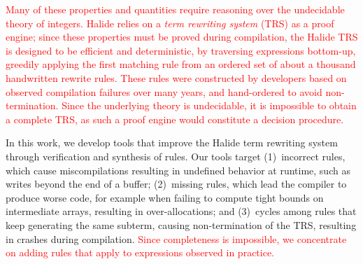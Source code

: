 \documentclass[acmsmall,review,anonymous]{acmart}\settopmatter{printfolios=true,printccs=false,printacmref=false}
\newcommand{\modified}[1]{\textcolor{red}{{#1}}}
\begin{document}
\modified{Many of these properties and quantities require reasoning over the
  undecidable theory of integers.  Halide relies on a \textit{term rewriting system}
  (TRS) as a proof engine; since these properties must be proved during compilation,
  the Halide TRS is designed to be efficient and deterministic, by traversing
  expressions bottom-up, greedily applying the first matching rule from an ordered
  set of about a thousand handwritten rewrite rules.  These rules were constructed
  by developers based on observed compilation failures over many years, and
  hand-ordered to avoid non-termination.  Since the underlying theory is undecidable,
  it is impossible to obtain a complete TRS, as such a proof engine would constitute
  a decision procedure. 
}

In this work, we develop tools that improve the Halide term rewriting
system through verification and synthesis of rules.  
%
Our tools target  (1)~incorrect rules, which cause miscompilations
resulting in undefined behavior at runtime, such as writes beyond the end of a
buffer;  (2)~missing rules, which lead  the compiler to produce worse code,
for example when failing to compute tight bounds on intermediate arrays, resulting
in over-allocations; and (3)~cycles among rules that keep generating the same
subterm, causing non-termination of the TRS, resulting in crashes during
compilation.  \modified{Since completeness is impossible, 
  we concentrate on adding rules that apply to expressions observed in practice.}

\end{document}
